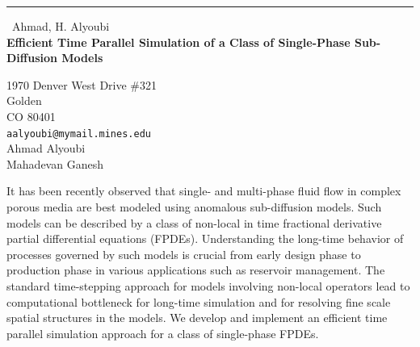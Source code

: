\documentclass{report}
\begin{document}
\begin{center}
\rule{6in}{1pt} \
{\large Ahmad, H. Alyoubi \\
{\bf Efficient Time Parallel Simulation of a Class of Single-Phase Sub-Diffusion Models}}

1970 Denver West Drive \#321 \\ Golden \\ CO 80401
\\
{\tt aalyoubi@mymail.mines.edu}\\
Ahmad Alyoubi\\
Mahadevan Ganesh\end{center}

It has been recently observed that single- and multi-phase fluid flow in
complex porous media are best modeled using anomalous sub-diffusion
models. Such models can be described by a class of non-local in time
fractional derivative partial differential equations (FPDEs).
Understanding the long-time behavior of processes governed by such models
is crucial from early design phase to production phase in various
applications such as reservoir management. The standard time-stepping
approach for models involving non-local operators lead to computational
bottleneck for long-time simulation and for resolving fine scale spatial
structures in the models. We develop and implement an efficient time
parallel simulation approach for a class of single-phase FPDEs.
\end{document}
